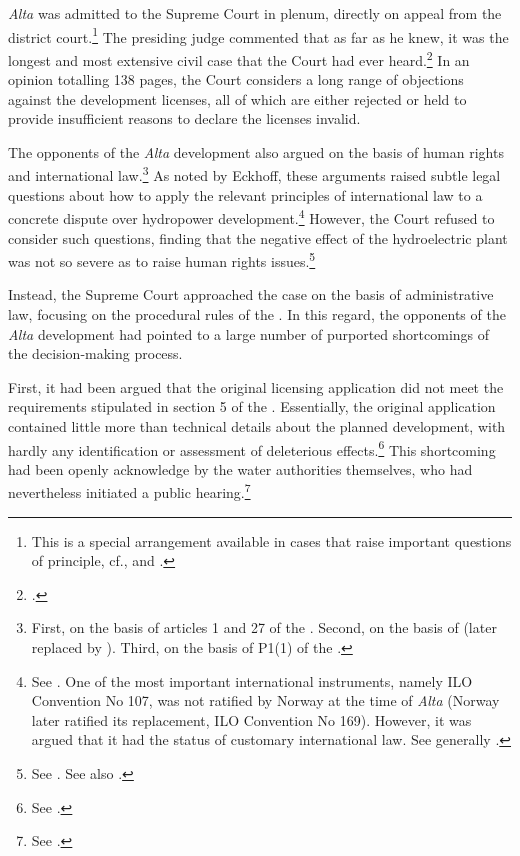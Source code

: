 {\it Alta} was admitted to the Supreme Court in plenum, directly on appeal from the district court.\footnote{This is a special arrangement available in cases that raise important questions of principle, cf., \cite[30-2]{cda05} and \cite[5]{ca15}.} The presiding judge commented that as far as he knew, it was the longest and most extensive civil case that the Court had ever heard.\footcite[254]{alta82} In an opinion totalling 138 pages, the Court considers a long range of objections against the development licenses, all of which are either rejected or held to provide insufficient reasons to declare the licenses invalid.

The opponents of the {\it Alta} development also argued on the basis of human rights and international law.\footnote{First, on the basis of articles 1 and 27 of the \cite{fnp}. Second, on the basis of \cite{ilo107} (later replaced by \cite{ilo169}). Third, on the basis of P1(1) of the \cite{echr}.} As noted by Eckhoff, these arguments raised subtle legal questions about how to apply the relevant principles of international law to a concrete dispute over hydropower development.\footnote{See \cite[351-352]{eckhoff82}. One of the most important international instruments, namely ILO Convention No 107, was not ratified by Norway at the time of {\it Alta} (Norway later ratified its replacement, ILO Convention No 169). However, it was argued that it had the status of customary international law. See generally \cite{eide80}.}
However, the Court refused to consider such  questions, finding that the negative effect of the hydroelectric plant was not so severe as to raise  human rights issues.\footnote{See \cite[299-300]{alta82}. See also \cite[351-352]{eckhoff82}.}

Instead, the Supreme Court approached the case on the basis of administrative law, focusing on the  procedural rules of the \cite{wra17}. In this regard, the opponents of the {\it Alta} development had pointed to a large number of purported shortcomings of the decision-making process. 

First, it had been argued that the original licensing application did not meet the requirements stipulated in section 5 of the \cite{wra17}. Essentially, the original application contained little more than technical details about the planned development, with hardly any identification or assessment of deleterious effects.\footnote{See \cite[264-265]{alta82}.} This shortcoming had been openly acknowledge by the water authorities themselves, who had nevertheless initiated a public hearing.\footnote{See \cite[265]{alta82}.}

